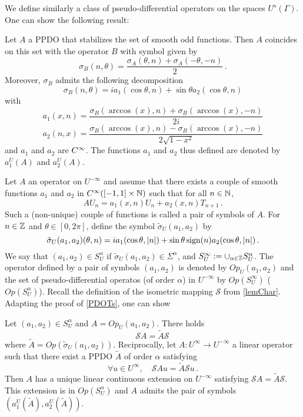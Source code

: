 \documentclass[a4paper]{article}
\begin{document}
We define similarly a class of pseudo-differential operators on the spaces $U^s(\Gamma)$. One can show the following result:
\begin{Lem}
	\label{TransportPPDO_U}
	Let $A$ a PPDO that stabilizes the set of smooth odd functions. Then $A$ coincides on this set with the operator $B$ with symbol given by 
	\[\sigma_B(n,\theta) = \frac{\sigma_A(\theta,n) + \sigma_A(-\theta,-n)}{2}\,.\]
	Moreover, $\sigma_B$ admits the following decomposition
	\[\sigma_B(n,\theta) = i a_1(\cos\theta,n) + \sin\theta a_2(\cos\theta,n)\]
	with
	\[a_1(x,n) = \frac{\sigma_B(\arccos(x),n) + \sigma_B(\arccos(x),-n)}{2i}\]
	\[a_2(n,x) = \frac{\sigma_B(\arccos(x),n) - \sigma_B(\arccos(x),-n)}{2\sqrt{1-x^2}}\] 
	and $a_1$ and $a_2$ are $C^{\infty}$. The functions $a_1$ and $a_2$ thus defined are denoted by $a_1^U(A)$ and $a_2^U(A)$. 
\end{Lem}
Let $A$ an operator on $U^{-\infty}$ and assume that there exists a couple of smooth functions $a_1$ and $a_2$ in $C^{\infty}([-1,1]\times \mathbb{N})$ such that for all $n \in \mathbb{N}$,
\[AU_n = a_1(x,n) U_n + a_2(x,n) T_{n+1}\,.\]
Such a (non-unique) couple of functions is called a pair of symbols of $A$. For $n\in \mathbb{Z}$ and $\theta \in [0,2\pi]$, define the symbol $\tilde{\sigma}_U(a_1,a_2)$ by
\[\tilde{\sigma}_U(a_1,a_2)(\theta,n) = i a_1(\cos\theta,\left\lvert n \right\rvert) + \sin\theta\,\text{sign}(n) a_2(\cos\theta,\left\lvert n \right\rvert)\,.\]
We say that $(a_1,a_2) \in S^\alpha_U$ if $\tilde{\sigma}_U(a_1,a_2) \in \Sigma^\alpha$, and $S^{\infty}_U \mathrel{\mathop:}= \cup_{\alpha \in \mathbb{Z}} S^\alpha_U$. The operator defined by a pair of symbols $(a_1,a_2)$ is denoted by $\textit{Op}_U(a_1,a_2)$ and the set of pseudo-differential operatos (of order $\alpha$) in $U^{-\infty}$  by $\textit{Op}(S^\infty_U)$ ($\textit{Op}(S^\alpha_U)$). 
Recall the definition of the isometric mapping $\mathcal{S}$ from \autoref{lemChar}. Adapting the proof of \autoref{PDOTs}, one can show
\begin{The}
	\label{PDOUs}
	Let $(a_1,a_2) \in S^\alpha_U$ and $A = \textit{Op}_U(a_1,a_2)$.  There holds
	\[\mathcal{S}A = \tilde{A}\mathcal{S}\,\]
	where $\tilde{A} = \textit{Op}(\tilde{\sigma}_U(a_1,a_2))$. 
	Reciprocally, let $A : U^{\infty} \to U^{-\infty}$ a linear operator such that there exist a PPDO $\tilde{A}$ of order $\alpha$ satisfying
	\[\forall u \in U^{\infty},\quad \mathcal{S}Au = \tilde{A}\mathcal{S}u\,.\] 
	Then $A$ has a unique linear continuous extension on $U^{-\infty}$ satisfying $\mathcal{S}A = \tilde{A} \mathcal{S}$. This extension is in $\textit{Op}(S^\alpha_U)$ and $A$ admits the pair of symbols $\left(a_1^U(\tilde{A}),a_2^U(\tilde{A})\right)$.
\end{The}
\end{document}
